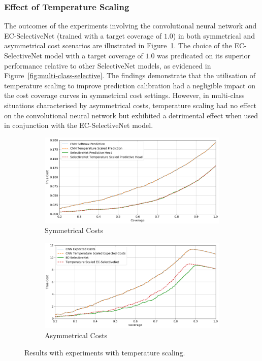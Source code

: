 \subsubsection{Effect of Temperature Scaling}
The outcomes of the experiments involving the convolutional neural network and EC-SelectiveNet (trained with a target coverage of $1.0$) in both symmetrical and asymmetrical cost scenarios are illustrated in Figure~\ref{fig:multi-class-temp}. The choice of the EC-SelectiveNet model with a target coverage of $1.0$ was predicated on its superior performance relative to other SelectiveNet models, as evidenced in Figure~\ref{fig:multi-class-selective}. The findings demonstrate that the utilisation of temperature scaling to improve prediction calibration had a negligible impact on the cost coverage curves in symmetrical cost settings. However, in multi-class situations characterised by asymmetrical costs, temperature scaling had no effect on the convolutional neural network but exhibited a detrimental effect when used in conjunction with the EC-SelectiveNet model.


\begin{figure}[!h]
	\centering
	\begin{subfigure}{\textwidth}
		\centering
		\includegraphics[width=\linewidth]{images/multi-class-temp-sym.png}
		\caption{Symmetrical Costs}	
	\end{subfigure}
	\begin{subfigure}{\textwidth}
		\centering
		\includegraphics[width=\linewidth]{images/multi-class-temp-asym.png}
		\caption{Asymmetrical Costs}
	\end{subfigure}
	\caption{Results with experiments with temperature scaling.}
	\label{fig:multi-class-temp}
\end{figure}

